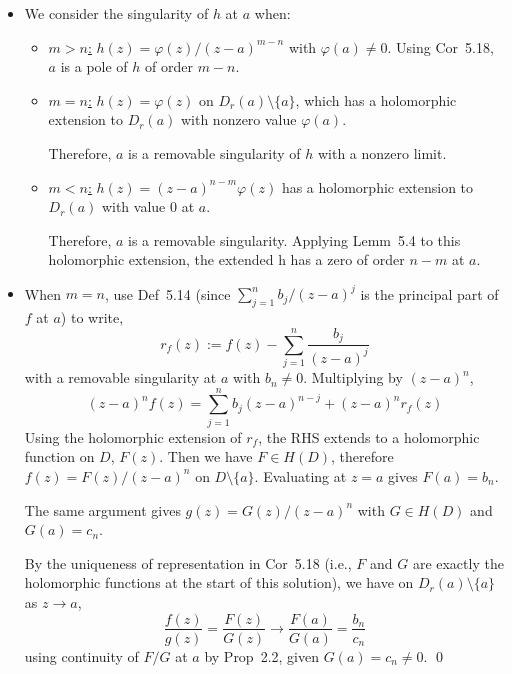 \documentclass[a4paper]{article}
\begin{document}
\begin{itemize}
    \item[\textbf{(a)}] We consider the singularity of $h$ at $a$ when:
    \begin{itemize}
        \item[\textbullet] \underline{$m > n$:} $h(z) = \varphi(z)/(z-a)^{m-n}$ with $\varphi(a) \neq 0$. Using Cor~5.18, $a$ is a pole of $h$ of order $m - n$.
        
        \item[\textbullet] \underline{$m = n$:} $h(z) = \varphi(z)$ on $D_r(a) \setminus \{a\}$, which has a holomorphic extension to $D_r(a)$ with nonzero value $\varphi(a)$. 
        
        Therefore, $a$ is a removable singularity of $h$ with a nonzero limit.
        
        \item[\textbullet] \underline{$m < n$:} $h(z) = (z-a)^{n-m} \varphi(z)$ has a holomorphic extension to $D_r(a)$ with value $0$ at $a$. 
        
        Therefore, $a$ is a removable singularity. Applying Lemm~5.4 to this holomorphic extension, the extended h has a zero of order $n - m$ at $a$.
    \end{itemize}
    \item[\textbf{(b)}] When $m = n$, use Def~5.14 (since $\sum_{j=1}^{n} b_j/(z-a)^j$ is the principal part of $f$ at $a$) to write,
    \[
    r_f(z) := f(z) - \sum_{j=1}^{n} \frac{b_j}{(z-a)^j}
    \]
    with a removable singularity at $a$ with $b_n \neq 0$. Multiplying by $(z-a)^n$,
    \[
    (z-a)^n f(z) = \sum_{j=1}^{n} b_j (z-a)^{n-j} + (z-a)^n r_f(z)
    \]
    Using the holomorphic extension of $r_f$, the RHS extends to a holomorphic function on $D$, $F(z)$. Then we have $F \in H(D)$, therefore $f(z) = F(z)/(z-a)^n$ on $D \setminus \{a\}$. Evaluating at $z = a$ gives $F(a) = b_n$. 
    
    The same argument gives $g(z) = G(z)/(z-a)^n$ with $G \in H(D)$ and $G(a) = c_n$.
    
    By the uniqueness of representation in Cor~5.18 (i.e., $F$ and $G$ are exactly the holomorphic functions at the start of this solution), we have on $D_r(a) \setminus \{a\}$ as $z \to a$,
    \[
    \frac{f(z)}{g(z)} = \frac{F(z)}{G(z)} \to \frac{F(a)}{G(a)} = \frac{b_n}{c_n}
    \]
    using continuity of $F/G$ at $a$ by Prop~2.2, given $G(a) = c_n \neq 0$. \qed
\end{itemize}

\newpage
\end{document}

